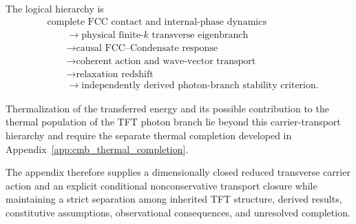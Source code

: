 The logical hierarchy is
\begin{align}
    &\text{complete FCC contact and internal-phase dynamics}
    \nonumber\\
    &\qquad\longrightarrow
    \text{physical finite-\(k\) transverse eigenbranch}
    \nonumber\\
    &\qquad\longrightarrow
    \text{causal FCC--Condensate response}
    \nonumber\\
    &\qquad\longrightarrow
    \text{coherent action and wave-vector transport}
    \nonumber\\
    &\qquad\longrightarrow
    \text{relaxation redshift}
    \nonumber\\
    &\qquad\longrightarrow
    \text{independently derived photon-branch stability criterion}.
    \label{eq:photon_relaxation_final_hierarchy}
\end{align}

Thermalization of the transferred energy and its possible contribution to the
thermal population of the TFT photon branch lie beyond this carrier-transport
hierarchy and require the separate thermal completion developed in
Appendix~\ref{app:cmb_thermal_completion}.

The appendix therefore supplies a dimensionally closed reduced transverse
carrier action and an explicit conditional nonconservative transport closure
while maintaining a strict separation among inherited TFT structure, derived
results, constitutive assumptions, observational consequences, and unresolved
completion.